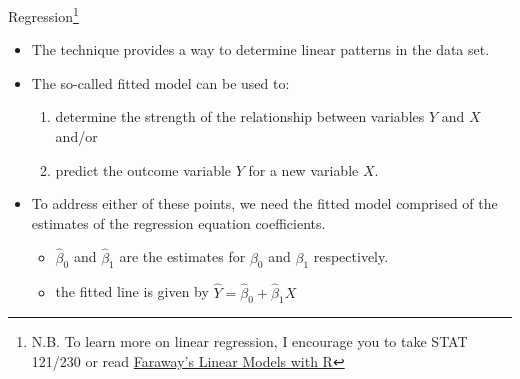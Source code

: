 \documentclass[xcolor=svgnames]{beamer}
\begin{document}
\begin{frame}[label=current]{Regression\footnote{N.B. To learn more on  linear regression, I encourage you to take STAT 121/230 or read \href{https://books.google.ca/books?id=i0DOBQAAQBAJ&printsec=frontcover&dq=Faraway\%27s+Linear+Models+with+R+(2005,+p.+59).\&hl=en\&sa=X\&ved=0ahUKEwinqMbTjq3iAhVhMX0KHedMCnkQ6AEIMjAB\#v=onepage\&q\&f=false}{Faraway's Linear Models with R}}}
\begin{itemize}
\item The technique provides a way to determine linear patterns in the data set.
\medskip
\item The so-called fitted model can be used to:
\begin{enumerate}
\item determine the strength of the relationship between variables $Y$ and $X$ and/or 
\item  predict the outcome variable $Y$ for a new variable $X$.
\end{enumerate}
\medskip
\item To address either of these points, we need the fitted model comprised of the estimates of the regression equation coefficients.
\begin{itemize}
\item  $\hat \beta_0$ and  $\hat \beta_1$ are the estimates for $\beta_0$ and $\beta_1$ respectively.
\item the fitted line is given by $\hat Y =\hat \beta_0 + \hat \beta_1 X$
\end{itemize}
\end{itemize}


\end{frame}
\end{document}
